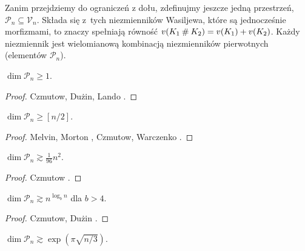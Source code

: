 Zanim przejdziemy do ograniczeń z dołu, zdefinujmy jeszcze jedną przestrzeń, $\mathcal P_n \subseteq \mathcal V_n$.
Składa się z~tych niezmienników Wasiljewa, które są jednocześnie morfizmami, to znaczy spełniają równość $v(K_1 \mathbin{\#} K_2) = v(K_1) + v(K_2)$.
Każdy niezmiennik jest wielomianową kombinacją niezmienników pierwotnych (elementów $\mathcal P_n$).

\begin{proposition}
    $\dim \mathcal P_n \ge 1$.
\end{proposition}

\begin{proof}
%
%
%
    Czmutow, Dużin, Lando \cite{duzhin94}.
\end{proof}

\begin{proposition}
    $\dim \mathcal P_n \ge [n/2]$.
\end{proposition}

\begin{proof}
%
%
%
%
    Melvin, Morton \cite{melvin95}, Czmutow, Warczenko \cite{varchenko97}.
\end{proof}

\begin{proposition}
    $\dim \mathcal P_n \gtrsim \frac{1}{96} n^2$.
\end{proposition}

\begin{proof}
%
    Czmutow \cite{duzhin96}.
\end{proof}

\begin{proposition}
    $\dim \mathcal P_n \gtrsim n^{\log_b n}$ dla $b > 4$.
\end{proposition}

\begin{proof}
%
%
    Czmutow, Dużin \cite{duzhin99}.
\end{proof}

\begin{proposition}
    $\dim \mathcal P_n \gtrsim \exp (\pi \sqrt{n/3})$.
\end{proposition}

